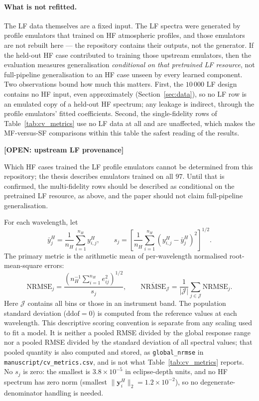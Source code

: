 \documentclass[12pt, letterpaper, oneside]{article}
\newcommand{\openitem}[2]{\par\begingroup\small\color{red!65!black}%
\noindent\textbf{[OPEN: #1]}\par\nobreak\noindent #2\par\endgroup}
\begin{document}
\paragraph{What is not refitted.} The LF data themselves are a fixed input.
The LF spectra were generated by profile emulators that \citet{Nussbaumer2026}
trained on HF atmospheric profiles, and those emulators are not rebuilt here
--- the repository contains their outputs, not the generator. If the held-out
HF case contributed to training those upstream emulators, then the evaluation
measures generalisation \emph{conditional on that pretrained LF resource},
not full-pipeline generalisation to an HF case unseen by every learned
component. Two observations bound how much this matters. First, the $10\,000$
LF design contains no HF input, even approximately
(Section~\ref{sec:data}), so no LF row is an emulated copy of a held-out HF
spectrum; any leakage is indirect, through the profile emulators' fitted
coefficients. Second, the single-fidelity rows of Table~\ref{tab:cv_metrics}
use no LF data at all and are unaffected, which makes the MF-versus-SF
comparisons within this table the safest reading of the results.

\openitem{upstream LF provenance}{Which HF cases trained the LF profile
emulators cannot be determined from this repository; the thesis describes
emulators trained on all $97$. Until that is confirmed, the multi-fidelity
rows should be described as conditional on the pretrained LF resource, as
above, and the paper should not claim full-pipeline generalisation.}

For each wavelength, let
\[
\bar y^H_j=\frac1{n_H}\sum_{i=1}^{n_H}y^H_{i,j},
\qquad
s_j=\left[\frac1{n_H}\sum_{i=1}^{n_H}
(y^H_{i,j}-\bar y^H_j)^2\right]^{1/2}.
\]
The primary metric is the arithmetic mean of per-wavelength normalised
root-mean-square errors:
\begin{equation}
\mathrm{NRMSE}_j=
\frac{\left(n_H^{-1}\sum_{i=1}^{n_H}e_{ij}^2\right)^{1/2}}{s_j},
\qquad
\overline{\mathrm{NRMSE}}_{\mathcal J}
=\frac1{|\mathcal J|}\sum_{j\in\mathcal J}\mathrm{NRMSE}_j.
\label{eq:NRMSE}
\end{equation}
Here $\mathcal J$ contains all bins or those in an instrument band. The
population standard deviation ($\mathrm{ddof}=0$) is computed from the
reference values at each wavelength. This descriptive scoring convention
is separate from any scaling used to fit a model. It is neither a pooled
RMSE divided by the global response range nor a pooled RMSE divided by the
standard deviation of all spectral values; that pooled quantity is also
computed and stored, as \texttt{global\_nrmse} in
\texttt{manuscript/cv\_metrics.csv}, and is not what
Table~\ref{tab:cv_metrics} reports. No $s_j$ is zero: the smallest is
$3.8\times10^{-5}$ in eclipse-depth units, and no HF spectrum has zero norm
(smallest $\|\mathbf y^H_i\|_2=1.2\times10^{-2}$), so no degenerate-denominator
handling is needed.
\end{document}
